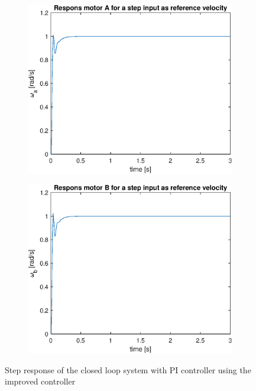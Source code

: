 \documentclass[a4paper,kul]{kulakarticle} %
\begin{document}
\begin{figure}[htp!]
	\centering
	\begin{subfigure}[b]{0.49\textwidth}
		\centering
		\includegraphics[width=\linewidth]{stepresponsA_cl_method2.eps}
		
	\end{subfigure}
	\hfill
	\begin{subfigure}[b]{0.49\textwidth}  
		\centering
		\includegraphics[width=\linewidth]{stepresponsB_cl_method2.eps}
		
	\end{subfigure}
	\caption{Step response of the closed loop system with PI controller using the improved controller}
	\label{fig:stepresponseclmethod2}
\end{figure}
\newpage
\end{document}
